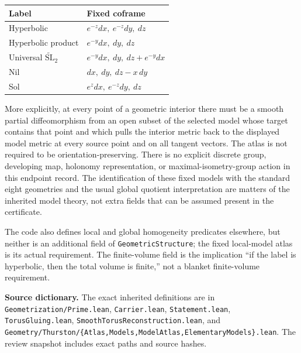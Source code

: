 \documentclass[
  letterpaper,
  11pt]{article}
\begin{document}
\begin{longtable}[]{@{}
  >{\raggedright\arraybackslash}p{}
  >{\raggedright\arraybackslash}p{}@{}}
\toprule\noalign{}
\begin{minipage}[b]{\linewidth}\raggedright
Label
\end{minipage} & \begin{minipage}[b]{\linewidth}\raggedright
Fixed coframe
\end{minipage} \\
\midrule\noalign{}
\endhead
\bottomrule\noalign{}
\endlastfoot
Hyperbolic & \(e^{-z}dx,\ e^{-z}dy,\ dz\) \\
Hyperbolic product & \(e^{-y}dx,\ dy,\ dz\) \\
Universal \(\widetilde{\mathrm{SL}}_2\) &
\(e^{-y}dx,\ dy,\ dz+e^{-y}dx\) \\
Nil & \(dx,\ dy,\ dz-x\,dy\) \\
Sol & \(e^zdx,\ e^{-z}dy,\ dz\) \\
\end{longtable}

More explicitly, at every point of a geometric interior there must be a
smooth partial diffeomorphism from an open subset of the selected model
whose target contains that point and which pulls the interior metric
back to the displayed model metric at every source point and on all
tangent vectors. The atlas is not required to be orientation-preserving.
There is no explicit discrete group, developing map, holonomy
representation, or maximal-isometry-group action in this endpoint
record. The identification of these fixed models with the standard eight
geometries and the usual global quotient interpretation are matters of
the inherited model theory, not extra fields that can be assumed present
in the certificate.

The code also defines local and global homogeneity predicates elsewhere,
but neither is an additional field of
{\small\texttt{Geometric\allowbreak{}Structure}}; the fixed local-model
atlas is its actual requirement. The finite-volume field is the
implication ``if the label is hyperbolic, then the total volume is
finite,'' not a blanket finite-volume requirement.

\textbf{Source dictionary.} The exact inherited definitions are in
{\small\texttt{Geometrization/\allowbreak{}Prime.\allowbreak{}lean}},
{\small\texttt{Carrier.\allowbreak{}lean}},
{\small\texttt{Statement.\allowbreak{}lean}},
{\small\texttt{Torus\allowbreak{}Gluing.\allowbreak{}lean}},
{\small\texttt{Smooth\allowbreak{}Torus\allowbreak{}Reconstruction.\allowbreak{}lean}},
and
{\small\texttt{Geometry/\allowbreak{}Thurston/\allowbreak{}\{Atlas,Models,Model\allowbreak{}Atlas,Elementary\allowbreak{}Models\}.\allowbreak{}lean}}.
The review snapshot includes exact paths and source hashes.
\end{document}
